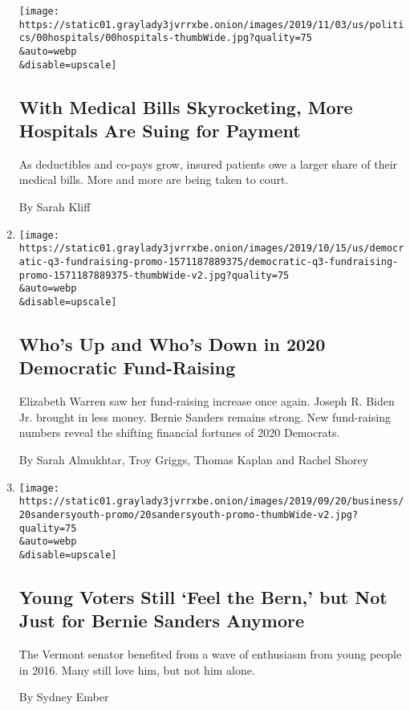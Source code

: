 \begin{enumerate}
  \texttt{[image: https://static01.graylady3jvrrxbe.onion/images/2019/11/03/us/politics/00hospitals/00hospitals-thumbWide.jpg?quality=75\\\&auto=webp\\\&disable=upscale]}

  \hypertarget{with-medical-bills-skyrocketing-more-hospitals-are-suing-for-payment}{%
  \subsection{With Medical Bills Skyrocketing, More Hospitals Are Suing
  for
  Payment}\label{with-medical-bills-skyrocketing-more-hospitals-are-suing-for-payment}}

  As deductibles and co-pays grow, insured patients owe a larger share
  of their medical bills. More and more are being taken to court.

  By Sarah Kliff
\item
  \href{/interactive/2019/10/16/us/elections/democratic-q3-fundraising.html}{}

  \texttt{[image: https://static01.graylady3jvrrxbe.onion/images/2019/10/15/us/democratic-q3-fundraising-promo-1571187889375/democratic-q3-fundraising-promo-1571187889375-thumbWide-v2.jpg?quality=75\\\&auto=webp\\\&disable=upscale]}

  \hypertarget{whos-up-and-whos-down-in-2020-democratic-fund-raising}{%
  \subsection{Who's Up and Who's Down in 2020 Democratic
  Fund-Raising}\label{whos-up-and-whos-down-in-2020-democratic-fund-raising}}

  Elizabeth Warren saw her fund-raising increase once again. Joseph R.
  Biden Jr. brought in less money. Bernie Sanders remains strong. New
  fund-raising numbers reveal the shifting financial fortunes of 2020
  Democrats.

  By Sarah Almukhtar, Troy Griggs, Thomas Kaplan and Rachel Shorey
\item
  \href{/2019/09/20/us/politics/bernie-sanders-young-voters.html}{}

  \texttt{[image: https://static01.graylady3jvrrxbe.onion/images/2019/09/20/business/20sandersyouth-promo/20sandersyouth-promo-thumbWide-v2.jpg?quality=75\\\&auto=webp\\\&disable=upscale]}

  \hypertarget{young-voters-still-feel-the-bern-but-not-just-for-bernie-sanders-anymore}{%
  \subsection{Young Voters Still `Feel the Bern,' but Not Just for
  Bernie Sanders
  Anymore}\label{young-voters-still-feel-the-bern-but-not-just-for-bernie-sanders-anymore}}

  The Vermont senator benefited from a wave of enthusiasm from young
  people in 2016. Many still love him, but not him alone.

  By Sydney Ember
\end{enumerate}

